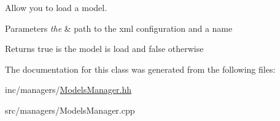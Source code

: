 Allow you to load a model. 


\begin{DoxyParams}{Parameters}
{\em the} & path to the xml configuration and a name \\
\hline
\end{DoxyParams}
\begin{DoxyReturn}{Returns}
true is the model is load and false otherwise 
\end{DoxyReturn}


The documentation for this class was generated from the following files\+:\begin{DoxyCompactItemize}
\item 
inc/managers/\hyperlink{ModelsManager_8hh}{Models\+Manager.\+hh}\item 
src/managers/Models\+Manager.\+cpp\end{DoxyCompactItemize}
